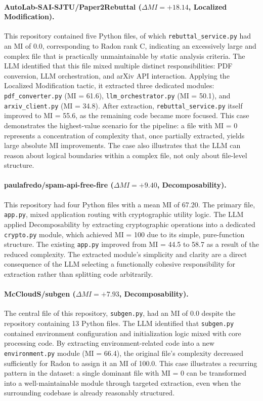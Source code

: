 \documentclass[sigconf,review,anonymous]{acmart}
\begin{document}
\paragraph{AutoLab-SAI-SJTU/Paper2Rebuttal ($\Delta MI = +18.14$, Localized Modification).}
This repository contained five Python files, of which \texttt{rebuttal\_service.py} had an MI of 0.0, corresponding to Radon rank C, indicating an excessively large and complex file that is practically unmaintainable by static analysis criteria. The LLM identified that this file mixed multiple distinct responsibilities: PDF conversion, LLM orchestration, and arXiv API interaction. Applying the Localized Modification tactic, it extracted three dedicated modules: \texttt{pdf\_converter.py} (MI = 61.6), \texttt{llm\_orchestrator.py} (MI = 50.1), and \texttt{arxiv\_client.py} (MI = 34.8). After extraction, \texttt{rebuttal\_service.py} itself improved to MI = 55.6, as the remaining code became more focused. This case demonstrates the highest-value scenario for the pipeline: a file with MI = 0 represents a concentration of complexity that, once partially extracted, yields large absolute MI improvements. The case also illustrates that the LLM can reason about logical boundaries within a complex file, not only about file-level structure.

\paragraph{paulafredo/spam-api-free-fire ($\Delta MI = +9.40$, Decomposability).}
This repository had four Python files with a mean MI of 67.20. The primary file, \texttt{app.py}, mixed application routing with cryptographic utility logic. The LLM applied Decomposability by extracting cryptographic operations into a dedicated \texttt{crypto.py} module, which achieved MI = 100 due to its simple, pure-function structure. The existing \texttt{app.py} improved from MI = 44.5 to 58.7 as a result of the reduced complexity. The extracted module's simplicity and clarity are a direct consequence of the LLM selecting a functionally cohesive responsibility for extraction rather than splitting code arbitrarily.

\paragraph{McCloudS/subgen ($\Delta MI = +7.93$, Decomposability).}
The central file of this repository, \texttt{subgen.py}, had an MI of 0.0 despite the repository containing 13 Python files. The LLM identified that \texttt{subgen.py} contained environment configuration and initialization logic mixed with core processing code. By extracting environment-related code into a new \texttt{environment.py} module (MI = 66.4), the original file's complexity decreased sufficiently for Radon to assign it an MI of 100.0. This case illustrates a recurring pattern in the dataset: a single dominant file with MI = 0 can be transformed into a well-maintainable module through targeted extraction, even when the surrounding codebase is already reasonably structured.
\end{document}
